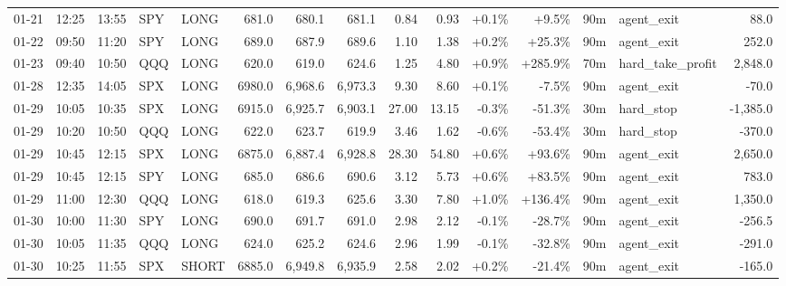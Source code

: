 \documentclass[11pt,a4paper,twoside]{article}
\begin{document}
\begin{landscape}
\begin{center}
\begin{longtable}{>{\color{txtmain}}l l l l l r r r r r r r r >{\color{txtmain}}l r}
01-21 & 12:25 & 13:55 & SPY & LONG & 681.0 & 680.1 & 681.1 & 0.84 & 0.93 & \textcolor{wingreen}{+0.1\%} & \textcolor{wingreen}{+9.5\%} & 90m & agent\_exit & \textcolor{wingreen}{88.0} \\
01-22 & 09:50 & 11:20 & SPY & LONG & 689.0 & 687.9 & 689.6 & 1.10 & 1.38 & \textcolor{wingreen}{+0.2\%} & \textcolor{wingreen}{+25.3\%} & 90m & agent\_exit & \textcolor{wingreen}{252.0} \\
01-23 & 09:40 & 10:50 & QQQ & LONG & 620.0 & 619.0 & 624.6 & 1.25 & 4.80 & \textcolor{wingreen}{+0.9\%} & \textcolor{wingreen}{+285.9\%} & 70m & hard\_take\_profit & \textcolor{wingreen}{2,848.0} \\
01-28 & 12:35 & 14:05 & SPX & LONG & 6980.0 & 6,968.6 & 6,973.3 & 9.30 & 8.60 & \textcolor{wingreen}{+0.1\%} & \textcolor{lossred}{-7.5\%} & 90m & agent\_exit & \textcolor{lossred}{-70.0} \\
01-29 & 10:05 & 10:35 & SPX & LONG & 6915.0 & 6,925.7 & 6,903.1 & 27.00 & 13.15 & \textcolor{lossred}{-0.3\%} & \textcolor{lossred}{-51.3\%} & 30m & hard\_stop & \textcolor{lossred}{-1,385.0} \\
01-29 & 10:20 & 10:50 & QQQ & LONG & 622.0 & 623.7 & 619.9 & 3.46 & 1.62 & \textcolor{lossred}{-0.6\%} & \textcolor{lossred}{-53.4\%} & 30m & hard\_stop & \textcolor{lossred}{-370.0} \\
01-29 & 10:45 & 12:15 & SPX & LONG & 6875.0 & 6,887.4 & 6,928.8 & 28.30 & 54.80 & \textcolor{wingreen}{+0.6\%} & \textcolor{wingreen}{+93.6\%} & 90m & agent\_exit & \textcolor{wingreen}{2,650.0} \\
01-29 & 10:45 & 12:15 & SPY & LONG & 685.0 & 686.6 & 690.6 & 3.12 & 5.73 & \textcolor{wingreen}{+0.6\%} & \textcolor{wingreen}{+83.5\%} & 90m & agent\_exit & \textcolor{wingreen}{783.0} \\
01-29 & 11:00 & 12:30 & QQQ & LONG & 618.0 & 619.3 & 625.6 & 3.30 & 7.80 & \textcolor{wingreen}{+1.0\%} & \textcolor{wingreen}{+136.4\%} & 90m & agent\_exit & \textcolor{wingreen}{1,350.0} \\
01-30 & 10:00 & 11:30 & SPY & LONG & 690.0 & 691.7 & 691.0 & 2.98 & 2.12 & \textcolor{lossred}{-0.1\%} & \textcolor{lossred}{-28.7\%} & 90m & agent\_exit & \textcolor{lossred}{-256.5} \\
01-30 & 10:05 & 11:35 & QQQ & LONG & 624.0 & 625.2 & 624.6 & 2.96 & 1.99 & \textcolor{lossred}{-0.1\%} & \textcolor{lossred}{-32.8\%} & 90m & agent\_exit & \textcolor{lossred}{-291.0} \\
01-30 & 10:25 & 11:55 & SPX & SHORT & 6885.0 & 6,949.8 & 6,935.9 & 2.58 & 2.02 & \textcolor{wingreen}{+0.2\%} & \textcolor{lossred}{-21.4\%} & 90m & agent\_exit & \textcolor{lossred}{-165.0} \\

\end{longtable}
\end{center}
\end{landscape}
\end{document}
